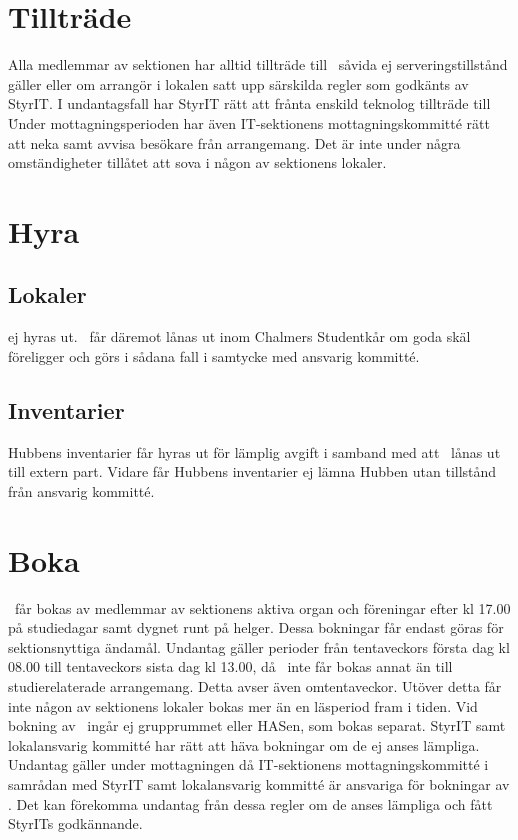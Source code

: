 \documentclass[11pt, includeaddress]{classes/cthit}
\begin{document}
\section{Tillträde}
Alla medlemmar av sektionen har alltid tillträde till \HUBBEN\ såvida ej serveringstillstånd gäller eller
om arrangör i lokalen satt upp särskilda regler som godkänts av StyrIT. I undantagsfall har StyrIT rätt
att frånta enskild teknolog tillträde till \HUBBEN\. Under mottagningsperioden har även IT-sektionens mottagningskommitté rätt att neka samt avvisa besökare från arrangemang.
Det är inte under några omständigheter tillåtet att sova i någon av sektionens lokaler.


\section{Hyra}
\subsection{Lokaler}
\HUBBEN{} ej hyras ut. \HUBBEN\ får däremot lånas ut inom Chalmers Studentkår om goda skäl
föreligger och görs i sådana fall i samtycke med ansvarig kommitté.

\subsection{Inventarier}
Hubbens inventarier får hyras ut för lämplig avgift i samband med att \HUBBEN\ lånas ut till extern part.
Vidare får Hubbens inventarier ej lämna Hubben utan tillstånd från ansvarig kommitté.


\section{Boka}
\HUBBEN\ får bokas av medlemmar av sektionens aktiva organ och föreningar efter kl 17.00 på
studiedagar samt dygnet runt på helger. Dessa bokningar får endast göras för sektionsnyttiga ändamål.
Undantag gäller perioder från tentaveckors första dag kl 08.00 till tentaveckors sista dag kl 13.00, då
\HUBBEN\ inte får bokas annat än till studierelaterade arrangemang. Detta avser även omtentaveckor.
Utöver detta får inte någon av sektionens lokaler bokas mer än en läsperiod fram i tiden.
Vid bokning av \HUBBEN\ ingår ej grupprummet eller HASen, som bokas separat. StyrIT samt
lokalansvarig kommitté har rätt att häva bokningar om de ej anses lämpliga. Undantag gäller under mottagningen då IT-sektionens mottagningskommitté i samrådan med StyrIT samt lokalansvarig kommitté är ansvariga för bokningar av \HUBBEN.
Det kan förekomma undantag från dessa regler om de anses lämpliga och fått StyrITs godkännande.
\end{document}
